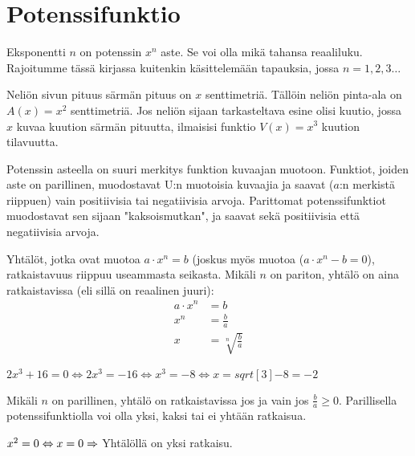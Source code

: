 \chapter{Potenssifunktio}


Eksponentti $n$ on potenssin $x^n$ aste. Se voi olla mikä tahansa reaaliluku. Rajoitumme tässä kirjassa kuitenkin käsittelemään tapauksia, jossa $n = 1, 2, 3\ldots $

\begin{esimerkki}
Neliön sivun pituus särmän pituus on $x$ senttimetriä. Tällöin neliön pinta-ala on $A(x)=x^2$ senttimetriä. Jos neliön sijaan tarkasteltava esine olisi kuutio, jossa $x$ kuvaa kuution särmän pituutta, ilmaisisi funktio $V(x)=x^3$ kuution tilavuutta.
\end{esimerkki}

Potenssin asteella on suuri merkitys funktion kuvaajan muotoon. Funktiot, joiden aste on parillinen, muodostavat U:n muotoisia kuvaajia ja saavat ($a$:n merkistä riippuen) vain positiivisia tai negatiivisia arvoja. Parittomat potenssifunktiot muodostavat sen sijaan "kaksoismutkan", ja saavat sekä positiivisia että negatiivisia arvoja.


Yhtälöt, jotka ovat muotoa $a\cdot x^n = b$ (joskus myös muotoa  ($a\cdot x^n - b = 0$), ratkaistavuus riippuu useammasta seikasta. Mikäli $n$ on pariton, yhtälö on aina ratkaistavissa (eli sillä on reaalinen juuri):
\begin{align*}
a\cdot x^n &= b \\
x^n &= \frac{b}{a} \\
x &= \sqrt[n]{\frac{b}{a}}
\end{align*}

\begin{esimerkki}
$2x^3 + 16 = 0 \Leftrightarrow 2x^3 = -16 \Leftrightarrow x^3 = -8  \Leftrightarrow x = sqrt[3]{-8} = -2 $
\end{esimerkki}

Mikäli $n$ on parillinen, yhtälö on ratkaistavissa jos ja vain jos $\frac{b}{a} \geq 0 $. Parillisella potenssifunktiolla voi olla yksi, kaksi tai ei yhtään ratkaisua.

\begin{esimerkki}
$x^2 = 0 \Leftrightarrow x = 0 \\
\Rightarrow$ Yhtälöllä on yksi ratkaisu.
\end{esimerkki}

